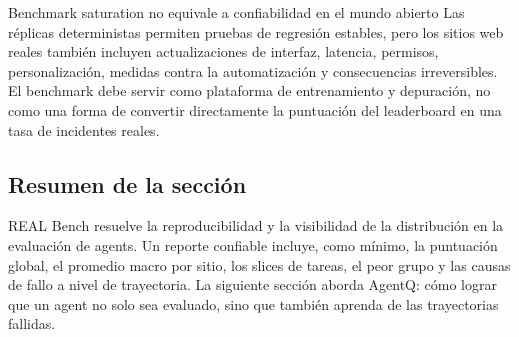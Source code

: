 \begin{warningbox}{Benchmark saturation no equivale a confiabilidad en el mundo abierto}
Las réplicas deterministas permiten pruebas de regresión estables, pero los sitios web reales también incluyen actualizaciones de interfaz, latencia, permisos, personalización, medidas contra la automatización y consecuencias irreversibles. El benchmark debe servir como plataforma de entrenamiento y depuración, no como una forma de convertir directamente la puntuación del leaderboard en una tasa de incidentes reales.
\end{warningbox}


\subsection{Resumen de la sección}

REAL Bench resuelve la reproducibilidad y la visibilidad de la distribución en la evaluación de agents. Un reporte confiable incluye, como mínimo, la puntuación global, el promedio macro por sitio, los slices de tareas, el peor grupo y las causas de fallo a nivel de trayectoria. La siguiente sección aborda AgentQ: cómo lograr que un agent no solo sea evaluado, sino que también aprenda de las trayectorias fallidas.
